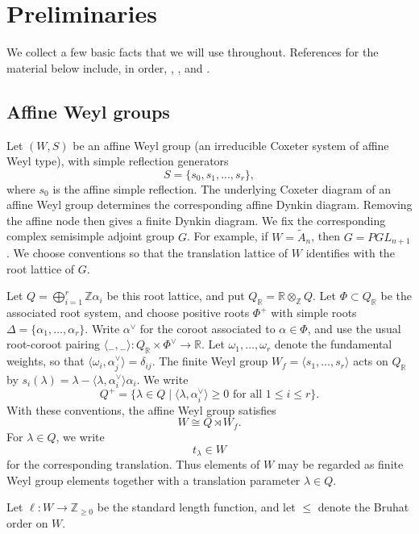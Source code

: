 \documentclass[a4paper,11pt]{amsart}
\newcommand{\placeholder}{{}_{-}}
\renewcommand{\dots}{\text{...}}
\newcommand{\N}{\mathbb{Z}_{\geq 0}}
\newcommand{\ra}{\rightarrow}
\numberwithin{equation}{subsection}
\theoremstyle{definition}
\theoremstyle{remark}
\begin{document}
\section{Preliminaries}\label{sec:prelim}

We collect a few basic facts that we will use throughout. References for the
material below include, in order, \cite{Hu-coxeter},
\cite{EMTW-soergel-intro}, and \cite{Kn-spherical-KL}.

\subsection{Affine Weyl groups}\label{sec:Affineintro}

Let $(W,S)$ be an affine Weyl group (an irreducible Coxeter
system of affine Weyl type), with simple reflection generators
\[
S=\{s_0,s_1,\dots,s_r\},
\]
where $s_0$ is the affine simple reflection. The underlying Coxeter diagram of
an affine Weyl group determines the corresponding affine Dynkin diagram.
Removing the affine node then gives a finite Dynkin diagram. We fix the
corresponding complex semisimple adjoint group $G$. For example, if $W=\tilde{A}_n$, then $G=PGL_{n+1}$.  We choose conventions so
that the translation lattice of $W$ identifies with the root lattice of $G$. 

Let
$Q=\bigoplus_{i=1}^r \mathbb Z\alpha_i$
be this root lattice, and put \(Q_{\mathbb R}=\mathbb R\otimes_{\mathbb Z} Q\).
Let \(\Phi\subset Q_{\mathbb R}\) be the associated root system, and choose
positive roots \(\Phi^+\) with simple roots
$\Delta=\{\alpha_1,\ldots,\alpha_r\}$.
Write \(\alpha^\vee\) for the coroot associated to \(\alpha\in\Phi\), and use
the usual root-coroot pairing
$\langle\placeholder,\placeholder\rangle:Q_{\mathbb R}\times \Phi^\vee\to \mathbb R$. Let \(\omega_1,\ldots,\omega_r\) denote the fundamental weights, so that
$\langle \omega_i,\alpha_j^\vee\rangle=\delta_{ij}$.
The finite Weyl group \(W_f=\langle s_1,\ldots,s_r\rangle\) acts on
\(Q_{\mathbb R}\) by
$s_i(\lambda)=\lambda-\langle \lambda,\alpha_i^\vee\rangle\alpha_i$.
We write
\[
Q^+ = \{\lambda\in Q \mid \langle \lambda,\alpha_i^\vee\rangle\geq 0
\text{ for all } 1\leq i\leq r\}.
\]
With these conventions, the affine Weyl group satisfies
\[
W\cong Q\rtimes W_f.
\]
For $\lambda\in Q$, we write
\[
t_\lambda\in W
\]
for the corresponding translation. Thus elements of $W$ may be regarded as
finite Weyl group elements together with a translation parameter
$\lambda\in Q$.

Let $\ell\colon W\ra \N$
be the standard length function, and let $\leq$ denote the Bruhat order on $W$.
\end{document}
